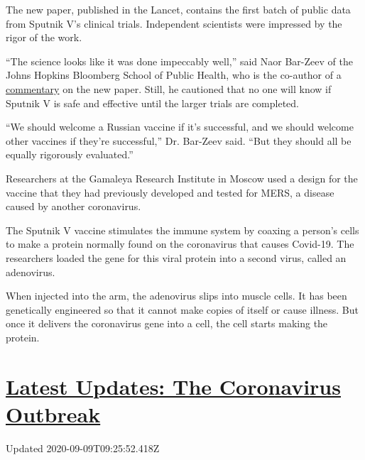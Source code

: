 The new paper, published in the Lancet, contains the first batch of
public data from Sputnik V's clinical trials. Independent scientists
were impressed by the rigor of the work.

``The science looks like it was done impeccably well,'' said Naor
Bar-Zeev of the Johns Hopkins Bloomberg School of Public Health, who is
the co-author of a
\href{https://www.thelancet.com/journals/lancet/article/PIIS0140-6736(20)31867-5/fulltext}{commentary}
on the new paper. Still, he cautioned that no one will know if Sputnik V
is safe and effective until the larger trials are completed.

``We should welcome a Russian vaccine if it's successful, and we should
welcome other vaccines if they're successful,'' Dr. Bar-Zeev said. ``But
they should all be equally rigorously evaluated.''

Researchers at the Gamaleya Research Institute in Moscow used a design
for the vaccine that they had previously developed and tested for MERS,
a disease caused by another coronavirus.

The Sputnik V vaccine stimulates the immune system by coaxing a person's
cells to make a protein normally found on the coronavirus that causes
Covid-19. The researchers loaded the gene for this viral protein into a
second virus, called an adenovirus.

When injected into the arm, the adenovirus slips into muscle cells. It
has been genetically engineered so that it cannot make copies of itself
or cause illness. But once it delivers the coronavirus gene into a cell,
the cell starts making the protein.

\hypertarget{latest-updates-the-coronavirus-outbreak}{%
\section{\texorpdfstring{\href{https://www.nytimes3xbfgragh.onion/2020/09/09/world/covid-19-coronavirus.html?action=click\&pgtype=Article\&state=default\&region=MAIN_CONTENT_1\&context=storylines_live_updates}{Latest
Updates: The Coronavirus
Outbreak}}{Latest Updates: The Coronavirus Outbreak}}\label{latest-updates-the-coronavirus-outbreak}}

Updated 2020-09-09T09:25:52.418Z

